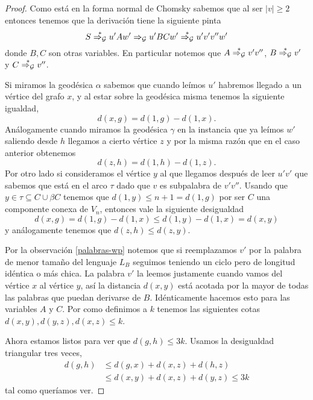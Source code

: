\documentclass[tesis.tex]{subfiles}
\newcommand{\deriva}{\overset{*}{\Rightarrow_{\cal G}}}
\begin{document}
\begin{proof}
Como está en la forma normal de Chomsky sabemos que al ser $|v| \ge 2$ entonces tenemos que la derivación tiene la siguiente pinta
\begin{equation*}
	S \deriva u'Aw' \Rightarrow_{\cal G} u'BC w' \deriva u'v'v''w'
\end{equation*}
donde $B,C$ son otras variables. En particular notemos que $A \deriva v'v''$, $B \deriva v'$ y $C \deriva v''$.


Si miramos la geodésica $\alpha$ sabemos que cuando leímos $u'$ habremos llegado a un vértice del grafo $x$, y al estar sobre la geodésica misma tenemos la siguiente igualdad,
\begin{equation*}
d(x,g) = d(1,g) - d(1,x).
\end{equation*}
Análogamente cuando miramos la geodésica $\gamma$ en la instancia que ya leímos $w'$ saliendo desde $h$ llegamos a cierto vértice $z$ y por la misma razón que en el caso anterior obtenemos
\begin{equation*}
	d(z,h) = d(1,h) - d(1,z).
\end{equation*}
Por otro lado si consideramos el vértice $y$ al que llegamos después de leer $u'v'$ que sabemos que está en el arco $\tau$ dado que $v$ es subpalabra de $v'v''$.
Usando que $y \in \tau \subseteq C \cup \beta C$ tenemos que $d(1,y) \le n+1 = d(1,g)$ por ser $C$ una componente conexa de $V_n$, entonces vale la siguiente desigualdad
\begin{equation*}
d(x,g) = d(1,g) - d(1,x) \le d(1,y) - d(1,x) = d(x,y)
\end{equation*}
y análogamente tenemos que $d(z,h) \le d(z,y)$.


Por la observación \ref{palabras-wp} notemos que si reemplazamos $v'$ por la palabra de menor tamaño del lenguaje $L_B$ seguimos teniendo un ciclo pero de longitud idéntica o más chica. 
La palabra $v'$ la leemos justamente cuando vamos del vértice $x$ al vértice $y$, así la distancia  $d(x,y)$ está acotada por la mayor de todas las palabras que puedan derivarse de $B$. 
Idénticamente hacemos esto para las variables $A$ y $C$.
Por como definimos a $k$ tenemos las siguientes cotas $d(x,y), d(y,z), d(x,z) \le k$.


Ahora estamos listos para ver que $d(g,h) \le 3k$. Usamos la desigualdad triangular tres veces,
\begin{align*}
	d(g,h) & \le d(g,x) + d(x,z) + d(h,z) \\
	& \le d(x,y) + d(x,z) + d(y,z) \le 3k
\end{align*}
tal como queríamos ver.
\end{proof}
\end{document}
